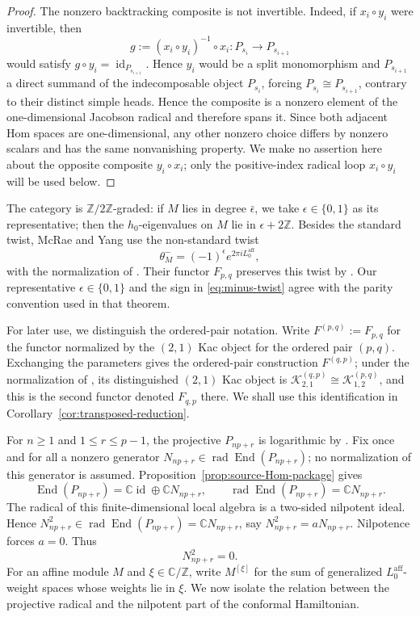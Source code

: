 \documentclass[12pt,leqno]{amsart}
\numberwithin{equation}{section}
\newcommand{\End}{\operatorname{End}}
\newcommand{\rad}{\operatorname{rad}}
\newcommand{\id}{\operatorname{id}}
\def\Z{\mathbb{Z}}
\def\C{\mathbb{C}}
\begin{document}
\begin{proof}
The nonzero backtracking composite is not invertible.  Indeed, if
$x_i\circ y_i$ were invertible, then
\[
 g:=(x_i\circ y_i)^{-1}\circ x_i:P_{s_i}\longrightarrow P_{s_{i+1}}
\]
would satisfy $g\circ y_i=\id_{P_{s_{i+1}}}$.  Hence $y_i$ would be a
split monomorphism and $P_{s_{i+1}}$ a direct summand of the
indecomposable object $P_{s_i}$, forcing
$P_{s_i}\cong P_{s_{i+1}}$, contrary to their distinct simple heads.
Hence the composite is a nonzero element of the one-dimensional Jacobson
radical and therefore spans it.  Since both adjacent Hom spaces
are one-dimensional, any other nonzero choice differs by nonzero scalars and
has the same nonvanishing property.  We make no assertion here about the
opposite composite $y_i\circ x_i$; only the positive-index radical loop
$x_i\circ y_i$ will be used below.
\end{proof}

The category is $\Z/2\Z$-graded: if $M$ lies in degree
$\bar\epsilon$, we take $\epsilon\in\{0,1\}$ as its representative; then
the $h_0$-eigenvalues on $M$ lie in $\epsilon+2\Z$.  Besides the standard twist, McRae and Yang use the non-standard twist
\begin{equation}\label{eq:minus-twist}
 \theta^-_M=(-1)^\epsilon e^{2\pi iL^{\mathrm{aff}}_0},
\end{equation}
with the normalization of \cite[Theorem~5.4]{McRaeYang}.  Their functor
$F_{p,q}$ preserves this twist by \cite[Theorem~7.15]{McRaeYang}.  Our representative
$\epsilon\in\{0,1\}$ and the sign in \eqref{eq:minus-twist} agree with
the parity convention used in that theorem.

For later use, we distinguish the ordered-pair notation.  Write
$F^{(p,q)}:=F_{p,q}$ for the functor normalized by the $(2,1)$ Kac object
for the ordered pair $(p,q)$.  Exchanging the parameters gives the
ordered-pair construction $F^{(q,p)}$; under the normalization of
\cite[Theorem~7.15]{McRaeYang}, its distinguished $(2,1)$ Kac object is
$\mathcal K^{(q,p)}_{2,1}\cong\mathcal K^{(p,q)}_{1,2}$, and this is the
second functor denoted $F_{q,p}$ there.  We shall use this identification
in Corollary~\ref{cor:transposed-reduction}.

For $n\geq1$ and $1\leq r\leq p-1$, the projective $P_{np+r}$ is
logarithmic by \cite[Theorem~4.13]{McRaeYang}.  Fix once and for all a nonzero generator
$N_{np+r}\in\rad\End(P_{np+r})$; no normalization of this generator is
assumed.  Proposition~\ref{prop:source-Hom-package} gives
\[
 \End(P_{np+r})=\C\id\oplus\C N_{np+r},\qquad
 \rad\End(P_{np+r})=\C N_{np+r}.
\]
The radical of this finite-dimensional local algebra is a two-sided
nilpotent ideal.  Hence
$N_{np+r}^2\in\rad\End(P_{np+r})=\C N_{np+r}$, say
$N_{np+r}^2=aN_{np+r}$.  Nilpotence forces $a=0$.
Thus
\[
 N_{np+r}^2=0.
\]
For an affine module $M$ and $\xi\in\C/\Z$, write $M^{[\xi]}$ for the sum
of generalized $L^{\mathrm{aff}}_0$-weight spaces whose weights lie in
$\xi$.  We now isolate the relation between the projective radical and the
nilpotent part of the conformal Hamiltonian.
\end{document}
